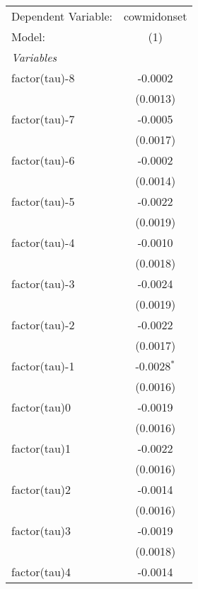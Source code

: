 \begingroup
\centering
\begin{tabular}{lc}
   \tabularnewline \midrule \midrule
   Dependent Variable:             & cowmidonset\\  
   Model:                          & (1)\\  
   \midrule
   \emph{Variables}\\
   factor(tau)-8                   & -0.0002\\   
                                   & (0.0013)\\   
   factor(tau)-7                   & -0.0005\\   
                                   & (0.0017)\\   
   factor(tau)-6                   & -0.0002\\   
                                   & (0.0014)\\   
   factor(tau)-5                   & -0.0022\\   
                                   & (0.0019)\\   
   factor(tau)-4                   & -0.0010\\   
                                   & (0.0018)\\   
   factor(tau)-3                   & -0.0024\\   
                                   & (0.0019)\\   
   factor(tau)-2                   & -0.0022\\   
                                   & (0.0017)\\   
   factor(tau)-1                   & -0.0028$^{*}$\\   
                                   & (0.0016)\\   
   factor(tau)0                    & -0.0019\\   
                                   & (0.0016)\\   
   factor(tau)1                    & -0.0022\\   
                                   & (0.0016)\\   
   factor(tau)2                    & -0.0014\\   
                                   & (0.0016)\\   
   factor(tau)3                    & -0.0019\\   
                                   & (0.0018)\\   
   factor(tau)4                    & -0.0014\\   

\end{tabular}
